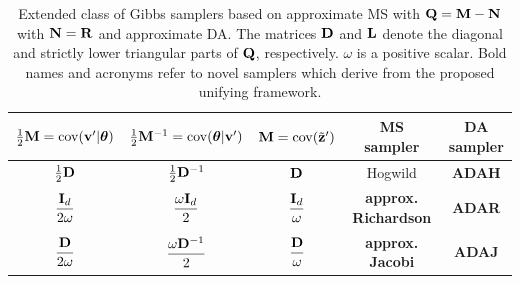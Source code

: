 \documentclass[nohypdvips,onefignum,onetabnum]{siamart171218}
\begin{document}
\begin{table}
{\footnotesize
  \caption{Extended class of Gibbs samplers based on approximate MS with $\mathbf{Q} = \mathbf{M} - \mathbf{N}$ with $\mathbf{N}=\mathbf{R}$ and approximate DA. The matrices $\mathbf{D}$ and $\mathbf{L}$ denote the diagonal and strictly lower triangular parts of $\mathbf{Q}$, respectively. $\omega$ is a positive scalar.
  Bold names and acronyms refer to novel samplers which derive from the proposed unifying framework.}
  \label{table:extended_approx_matrix_splitting}
  \begin{center}
    \begin{tabular}{|c|c|c|c|c|} 
      \hline
      $\frac{1}{2}\mathbf{M} = \mathrm{cov}(\mathbf{v}'|\boldsymbol{\theta})$ & $\frac{1}{2}\mathbf{M}^{-1} = \mathrm{cov}(\boldsymbol{\theta}|\mathbf{v}')$ & $\mathbf{M} = \mathrm{cov}(\tilde{\mathbf{z}}')$ & MS sampler & DA sampler \\
      \hline 
      $\frac{1}{2}\mathbf{D}$ & $\frac{1}{2}\mathbf{D}^{-1}$ & $\mathbf{D}$ & Hogwild \cite{Johnson2013} & {\bf ADAH}\\[1em]
      $\dfrac{\mathbf{I}_d}{2\omega}$ & $\dfrac{\omega\mathbf{I}_d}{2}$ & $\dfrac{\mathbf{I}_d}{\omega}$ & {\bf approx. Richardson} & {\bf ADAR}\\[1em]
     $\dfrac{\mathbf{D}}{2\omega}$ & $\dfrac{\omega\mathbf{D}^{-1}}{2}$ & $\dfrac{\mathbf{D}}{\omega}$ & {\bf approx. Jacobi} & {\bf ADAJ}\\[1em]
      \hline
    \end{tabular}
  \end{center}
}
\end{table}
\end{document}
